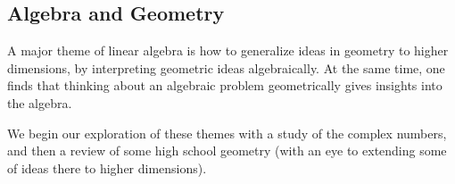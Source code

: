 % 
%
%

\begin{partbacktext}
\part{Algebra and Geometry}
\noindent  
A major theme of linear algebra is how to generalize ideas in geometry to 
higher dimensions, by interpreting geometric ideas algebraically.  At the same time, one finds that thinking about an algebraic problem geometrically gives
insights into the algebra.  

We begin our exploration of these themes with a study of the complex numbers, and then a review of some high school geometry (with an eye to extending some of ideas there to higher dimensions).

\end{partbacktext}
